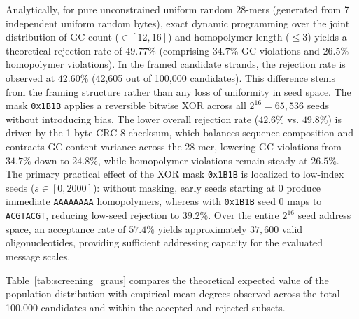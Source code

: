 Analytically, for pure unconstrained uniform random 28-mers (generated from 7 independent uniform random bytes), exact dynamic programming over the joint distribution of GC count ($\in [12, 16]$) and homopolymer length ($\le 3$) yields a theoretical rejection rate of $49.77\%$ (comprising $34.7\%$ GC violations and $26.5\%$ homopolymer violations). In the framed candidate strands, the rejection rate is observed at $42.60\%$ (42,605 out of 100,000 candidates). This difference stems from the framing structure rather than any loss of uniformity in seed space. The mask \texttt{0x1B1B} applies a reversible bitwise XOR across all $2^{16} = 65{,}536$ seeds without introducing bias. The lower overall rejection rate ($42.6\%$ vs. $49.8\%$) is driven by the 1-byte CRC-8 checksum, which balances sequence composition and contracts GC content variance across the 28-mer, lowering GC violations from $34.7\%$ down to $24.8\%$, while homopolymer violations remain steady at $26.5\%$. The primary practical effect of the XOR mask \texttt{0x1B1B} is localized to low-index seeds ($s \in [0, 2000]$): without masking, early seeds starting at 0 produce immediate \texttt{AAAAAAAA} homopolymers, whereas with \texttt{0x1B1B} seed 0 maps to \texttt{ACGTACGT}, reducing low-seed rejection to $39.2\%$. Over the entire $2^{16}$ seed address space, an acceptance rate of $57.4\%$ yields approximately $37{,}600$ valid oligonucleotides, providing sufficient addressing capacity for the evaluated message scales.

Table~\ref{tab:screening_graus} compares the theoretical expected value of the population distribution with empirical mean degrees observed across the total 100,000 candidates and within the accepted and rejected subsets.
\begin{table}[htbp]
    \centering
    \small
    \caption{Comparison of mean degree before and after biological screening ($K = 32$, $c = 0.1$, $\delta = 0.10$, 100,000 samples).}
    \label{tab:screening_graus}
\end{table}

